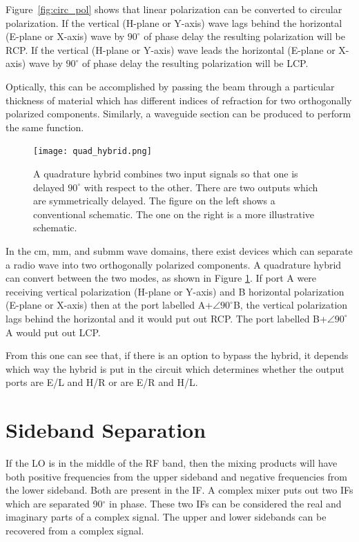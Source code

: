 \documentclass[letterpaper,11pt]{book}
\begin{document}
Figure~\ref{fig:circ_pol} shows that linear polarization can be converted to 
circular polarization.  If the vertical (H-plane or Y-axis) wave lags
behind the horizontal (E-plane or X-axis) wave by $90^{\circ}$ of
phase delay the resulting polarization will be RCP.
If the vertical (H-plane or Y-axis) wave leads
the horizontal (E-plane or X-axis) wave by $90^{\circ}$ of
phase delay the resulting polarization will be LCP.

Optically, this can be accomplished
by passing the beam through a particular thickness of material which
has different indices of refraction for two orthogonally polarized
components. Similarly, a waveguide section can be produced to perform the
same function.

\begin{figure}[h!tb]
\begin{center}
\texttt{[image: quad\_hybrid.png]}
\caption[Quadrature hybrid]{\label{fig:quad-hybrid}A quadrature hybrid
combines two input signals so that one is delayed $90^{\circ}$
with respect to the other. There are two outputs which are
symmetrically delayed.  The figure on the left shows a
conventional schematic.  The one on the right is a more
illustrative schematic.}
\end{center}
\end{figure}
In the cm, mm, and submm wave domains, there exist devices which can
separate a radio wave into two orthogonally polarized components.
A quadrature hybrid can convert between the two modes, as shown in
Figure \ref{fig:quad-hybrid}. If port A were receiving
vertical polarization (H-plane or Y-axis) and B horizontal polarization 
(E-plane or X-axis) then at the port labelled A+$\angle 90^{\circ}$B, the
vertical polarization lags behind the horizontal and it would put out RCP.
The port labelled B+$\angle 90^{\circ}$A would put out LCP.

From this one can see that, if there is an option to bypass the hybrid, it 
depends which way the hybrid is put in the 
circuit which determines whether the output ports are E/L and H/R or are
E/R and H/L.

\chapter{Sideband Separation}\label{app:complex}


If the LO is in the middle of the RF band, then the mixing products will have
both positive frequencies from the upper sideband and negative frequencies from
the lower sideband. Both are present in the IF.  A complex mixer puts out
two IFs which are separated 90$^{\circ}$ in phase.  These two IFs can be
considered the real and imaginary parts of a complex signal. The upper and
lower sidebands can be recovered from a complex signal.
\end{document}
